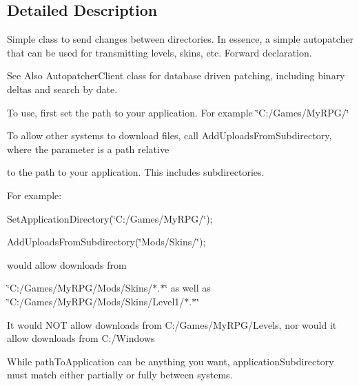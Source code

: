 \subsection{Detailed Description}
Simple class to send changes between directories. In essence, a simple autopatcher that can be used for transmitting levels, skins, etc. Forward declaration.

\begin{DoxySeeAlso}{See Also}
Autopatcher\-Client class for database driven patching, including binary deltas and search by date.
\end{DoxySeeAlso}
To use, first set the path to your application. For example \char`\"{}\-C\-:/\-Games/\-My\-R\-P\-G/\char`\"{}\par
 To allow other systems to download files, call Add\-Uploads\-From\-Subdirectory, where the parameter is a path relative\par
 to the path to your application. This includes subdirectories.\par
 For example\-:\par
 Set\-Application\-Directory(\char`\"{}\-C\-:/\-Games/\-My\-R\-P\-G/\char`\"{});\par
 Add\-Uploads\-From\-Subdirectory(\char`\"{}\-Mods/\-Skins/\char`\"{});\par
 would allow downloads from\par
 \char`\"{}\-C\-:/\-Games/\-My\-R\-P\-G/\-Mods/\-Skins/$\ast$.$\ast$\char`\"{} as well as \char`\"{}\-C\-:/\-Games/\-My\-R\-P\-G/\-Mods/\-Skins/\-Level1/$\ast$.$\ast$\char`\"{}\par
 It would N\-O\-T allow downloads from C\-:/\-Games/\-My\-R\-P\-G/\-Levels, nor would it allow downloads from C\-:/\-Windows\par
 While path\-To\-Application can be anything you want, application\-Subdirectory must match either partially or fully between systems. 


